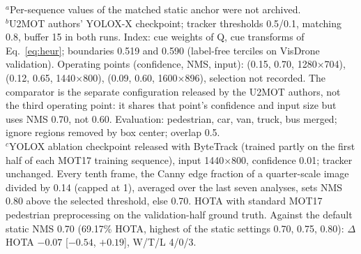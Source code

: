\begin{table}[t]
\smallskip
\parbox{\textwidth}{\raggedright
$^{a}$Per-sequence values of the matched static anchor were not archived.\\
$^{b}$U2MOT authors' YOLOX-X checkpoint; tracker thresholds 0.5/0.1, matching 0.8, buffer 15 in both runs. Index: cue weights of Q, cue transforms of Eq.~\eqref{eq:heur}; boundaries 0.519 and 0.590 (label-free terciles on VisDrone validation). Operating points (confidence, NMS, input): (0.15, 0.70, 1280$\times$704), (0.12, 0.65, 1440$\times$800), (0.09, 0.60, 1600$\times$896), selection not recorded. The comparator is the separate configuration released by the U2MOT authors, not the third operating point: it shares that point's confidence and input size but uses NMS 0.70, not 0.60. Evaluation: pedestrian, car, van, truck, bus merged; ignore regions removed by box center; overlap 0.5.\\
$^{c}$YOLOX ablation checkpoint released with ByteTrack \cite{zhang2022bytetrack} (trained partly on the first half of each MOT17 training sequence), input 1440$\times$800, confidence 0.01; tracker unchanged. Every tenth frame, the Canny edge fraction of a quarter-scale image divided by 0.14 (capped at 1), averaged over the last seven analyses, sets NMS 0.80 above the selected threshold, else 0.70. HOTA with standard MOT17 pedestrian preprocessing on the validation-half ground truth. Against the default static NMS 0.70 (69.17\% HOTA, highest of the static settings 0.70, 0.75, 0.80): $\Delta$HOTA $-0.07$ [$-0.54$, $+0.19$], W/T/L 4/0/3.}
\end{table}
